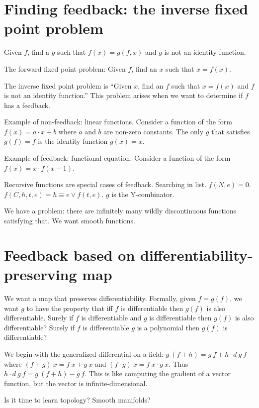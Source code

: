 \section{Finding feedback: the inverse fixed point problem}

Given \(f\), find a \(g\) such that \(f(x) = g(f,x)\) and \(g\) is not an identity function.

The forward fixed point problem:
Given \(f\), find an \(x\) such that \(x=f(x)\).

The inverse fixed point problem is
``Given \( x \), find an \( f \) such that \( x = f(x) \) and \(f\) is not an identity function.''
This problem arises when we want to determine
if \(f\) has a feedback.

Example of non-feedback: linear functions.
Consider a function of the form \(f(x) = a \cdot x + b\) where \(a\) and \(b\) are non-zero constants.
The only \(g\) that satisfies \(g(f) = f\) is the identity function \(g(x)=x\).

Example of feedback: functional equation.
Consider a function of the form \(f(x) = x \cdot f(x-1)\).

Recursive functions are special cases of feedback.
Searching in list.
\(f(N,e) = 0\).
\(f(C,h,t,e) = h \equiv e \vee f(t,e)\).
\(g\) is the Y-combinator.

We have a problem: there are infinitely many wildly discontinuous functions satisfying that.
We want smooth functions.

\section{Feedback based on differentiability-preserving map}

We want a map that preserves differentiability.
Formally, given \(f=g(f)\), we want \(g\) to have the property
that iff \(f\) is differentiable then \(g(f)\) is also differentiable.
Surely if \(f\) is differentiable and \(g\) is differentiable then \(g(f)\) is also differentiable?
Surely if \(f\) is differentiable \(g\) is a polynomial then \(g(f)\) is differentiable?

We begin with the generalized differential on a field:
\( g~(f+h) = g~f + h \cdot d~g~f \)
where \( (f + g)~x = f~x + g~x \) and \( (f \cdot g)~x = f~x \cdot g~x \).
Thus \( h \cdot d~g~f = g~(f+h) - g~f \).
This is like computing the gradient of a vector function,
but the vector is infinite-dimensional.

Is it time to learn topology? Smooth manifolds?

